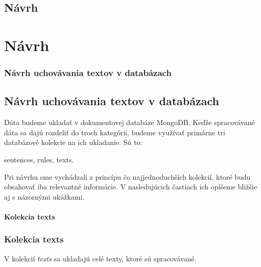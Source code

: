 \newpage
%
%
{
	\section{Návrh}
}
{
	\chapter{Návrh}
}
\label{section:design}

%
%
{
	\subsection{Návrh uchovávania textov v databázach}
}
{
	\section{Návrh uchovávania textov v databázach}
}
\label{subsection:our_design_persisting_data}
Dáta budeme ukladať v dokumentovej databáze MongoDB. Keďže spracovávané dáta sa dajú rozdeliť do troch kategórií, budeme využívať primárne tri databázové kolekcie na ich ukladanie. Sú to:

\begin{my_itemize}
	\myitem sentences,
	\myitem rules,
	\myitem texts.
\end{my_itemize}
	
Pri návrhu sme vychádzali z princípu čo najjednoduchších kolekcií, ktoré budu obsahovať iba relevantné informácie.
V nasledujúcich častiach ich opíšeme bližšie aj s názornými ukážkami.

%
%
{
	\subsubsection{Kolekcia texts}
}
{
	\subsection{Kolekcia texts}
}
V kolekcií \textit{texts} sa ukladajú celé texty, ktoré sú spracovávané. 

